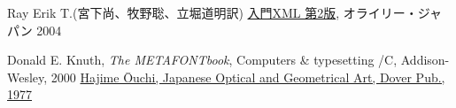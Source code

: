 \begin{thebibliography}{99}
\iffalse
 \bibitem{SVGECMAScript}
\href{http://www.w3.org/TR/SVG11/ecmascript-binding.html}
      {ECMAScript Language Binding for SVG}, \newline
      {\texttt{http://www.w3.org/TR/SVG11/ecmascript-binding.html}}
\fi

  Ray Erik T.(宮下尚、牧野聡、立堀道明訳)
\href{http://www.amazon.co.jp/exec/obidos/ASIN/4873111846/qid=1144562915/sr=1-19/br_lfbnb_b_19/503-6113071-5894369}{入門XML 第2版}, オライリー・ジャパン 2004
\iffalse
 \bibitem{JQUERY}jQuery Community Experts (株式会社クイープ 訳), \href{http://www.amazon.co.jp/jQuery%E3%82%AF%E3%83%83%E3%82%AF%E3%83%96%E3%83%83%E3%82%AF-jQuery-Community-Experts/dp/4873114683/ref=sr_1_4?ie=UTF8&qid=1304690839&sr=8-4g}
{jQueryクックブック}, オライリージャパン, 2010 
\fi
\ifSeminor
\else
  Donald E. Knuth, {\it The METAFONTbook}, Computers \&
	typesetting /C, Addison-Wesley, 2000
\fi
{}\href{http://www.amazon.co.jp/Japanese-Optical-Geometrical-Pictorial-Archives/dp/048623553X/ref=sr_1_8?ie=UTF8&s=english-books&qid=1206946932&sr=8-8}
{Hajime \=Ouchi, Japanese Optical and Geometrical Art, Dover Pub., 1977 }


\end{thebibliography}
